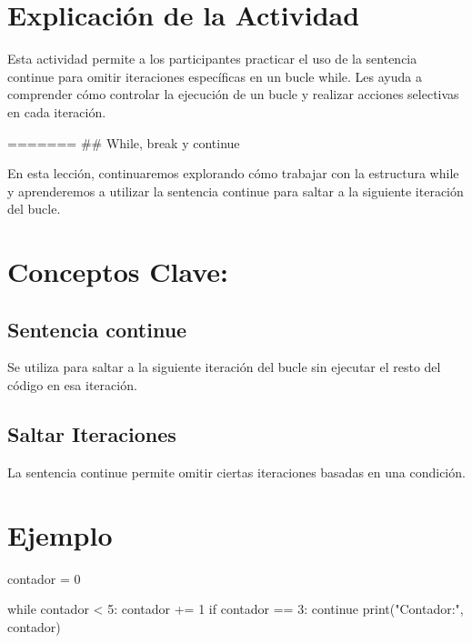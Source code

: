 \documentclass[
  a4paper,
  DIV=11,
  numbers=noendperiod,
  onepage,
  openany]{scrreprt}
\newenvironment{Shaded}{\begin{snugshade}}{\end{snugshade}}
\newcommand{\BuiltInTok}[1]{\textcolor[rgb]{0.00,0.23,0.31}{#1}}
\newcommand{\ControlFlowTok}[1]{\textcolor[rgb]{0.00,0.23,0.31}{#1}}
\newcommand{\DecValTok}[1]{\textcolor[rgb]{0.68,0.00,0.00}{#1}}
\newcommand{\NormalTok}[1]{\textcolor[rgb]{0.00,0.23,0.31}{#1}}
\newcommand{\OperatorTok}[1]{\textcolor[rgb]{0.37,0.37,0.37}{#1}}
\newcommand{\StringTok}[1]{\textcolor[rgb]{0.13,0.47,0.30}{#1}}
\begin{document}
\hypertarget{explicaciuxf3n-de-la-actividad-38}{%
\section{Explicación de la
Actividad}\label{explicaciuxf3n-de-la-actividad-38}}

Esta actividad permite a los participantes practicar el uso de la
sentencia continue para omitir iteraciones específicas en un bucle
while. Les ayuda a comprender cómo controlar la ejecución de un bucle y
realizar acciones selectivas en cada iteración.

======= \#\# While, break y continue

En esta lección, continuaremos explorando cómo trabajar con la
estructura while y aprenderemos a utilizar la sentencia continue para
saltar a la siguiente iteración del bucle.

\hypertarget{conceptos-clave-41}{%
\section{Conceptos Clave:}\label{conceptos-clave-41}}

\hypertarget{sentencia-continue-1}{%
\subsection{Sentencia continue}\label{sentencia-continue-1}}

Se utiliza para saltar a la siguiente iteración del bucle sin ejecutar
el resto del código en esa iteración.

\hypertarget{saltar-iteraciones-1}{%
\subsection{Saltar Iteraciones}\label{saltar-iteraciones-1}}

La sentencia continue permite omitir ciertas iteraciones basadas en una
condición.

\hypertarget{ejemplo-41}{%
\section{Ejemplo}\label{ejemplo-41}}

\begin{Shaded}
\begin{Highlighting}[]
\NormalTok{contador }\OperatorTok{=} \DecValTok{0}

\ControlFlowTok{while}\NormalTok{ contador }\OperatorTok{\textless{}} \DecValTok{5}\NormalTok{:}
\NormalTok{    contador }\OperatorTok{+=} \DecValTok{1}
    \ControlFlowTok{if}\NormalTok{ contador }\OperatorTok{==} \DecValTok{3}\NormalTok{:}
        \ControlFlowTok{continue}
    \BuiltInTok{print}\NormalTok{(}\StringTok{"Contador:"}\NormalTok{, contador)}
\end{Highlighting}
\end{Shaded}
\end{document}
